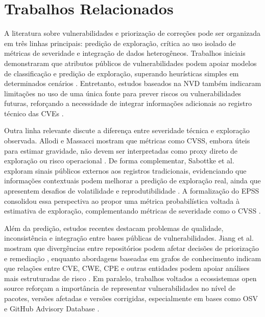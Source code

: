 \section{Trabalhos Relacionados}

A literatura sobre vulnerabilidades e priorização de correções pode ser organizada em três linhas principais: predição de exploração, crítica ao uso isolado de métricas de severidade e integração de dados heterogêneos. Trabalhos iniciais demonstraram que atributos públicos de vulnerabilidades podem apoiar modelos de classificação e predição de exploração, superando heurísticas simples em determinados cenários \cite{bozorgi2010_beyond_heuristics}. Entretanto, estudos baseados na NVD também indicaram limitações no uso de uma única fonte para prever riscos ou vulnerabilidades futuras, reforçando a necessidade de integrar informações adicionais ao registro técnico das CVEs \cite{zhang2011_nvd_predict,zhang2015_nvd_cyber_risks}.

Outra linha relevante discute a diferença entre severidade técnica e exploração observada. Allodi e Massacci mostram que métricas como CVSS, embora úteis para estimar gravidade, não devem ser interpretadas como proxy direto de exploração ou risco operacional \cite{allodi2012_preliminary,allodi2014_case_control}. De forma complementar, Sabottke et al. exploram sinais públicos externos aos registros tradicionais, evidenciando que informações contextuais podem melhorar a predição de exploração real, ainda que apresentem desafios de volatilidade e reprodutibilidade \cite{sabottke2015_social_media}. A formalização do EPSS consolidou essa perspectiva ao propor uma métrica probabilística voltada à estimativa de exploração, complementando métricas de severidade como o CVSS \cite{jacobs2019_epss,jacobs2020_remediation,jacobs2021_epss}.

Além da predição, estudos recentes destacam problemas de qualidade, inconsistência e integração entre bases públicas de vulnerabilidades. Jiang et al. mostram que divergências entre repositórios podem afetar decisões de priorização e remediação \cite{jiang2021_inconsistency}, enquanto abordagens baseadas em grafos de conhecimento indicam que relações entre CVE, CWE, CPE e outras entidades podem apoiar análises mais estruturadas de risco \cite{shi2024_threat_kg,yin2024_vulkg}. Em paralelo, trabalhos voltados a ecossistemas open source reforçam a importância de representar vulnerabilidades no nível de pacotes, versões afetadas e versões corrigidas, especialmente em bases como OSV e GitHub Advisory Database \cite{wu2024_affected_libraries,ruohonen2025_osv_propagation,mandl2026_osv_groundtruth}.

